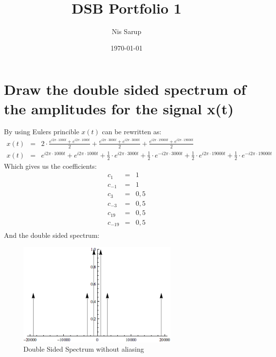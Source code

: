 \documentclass[a4wide,10pt]{article}
\begin{document}
\title{DSB Portfolio 1}
\author{Nis Sarup}
\date{\today}
\maketitle
\newpage

\tableofcontents
\newpage
\section{Draw the double sided spectrum of the amplitudes for the signal x(t)} %
\label{sec:draw_the_double_sided_spectrum_of_the_amplitudes_for_the_signal_x_t_}
By using Eulers princible $x(t)$ can be rewritten as:
\begin{eqnarray}
	x(t)&=&2\cdot \frac{e^{i2\pi \cdot 1000t}+e^{i2\pi \cdot 1000t}}{2}+\frac{e^{i2\pi \cdot 3000t}+e^{i2\pi \cdot 3000t}}{2}+\frac{e^{i2\pi \cdot 19000t}+e^{i2\pi \cdot 19000t}}{2} \nonumber \\
	x(t)&=&e^{i2\pi \cdot 1000t}+e^{i2\pi \cdot 1000t}+\frac{1}{2} \cdot e^{i2\pi \cdot 3000t}+\frac{1}{2} \cdot e^{-i2\pi \cdot 3000t}+\frac{1}{2} \cdot e^{i2\pi \cdot 19000t}+\frac{1}{2} \cdot e^{-i2\pi \cdot 19000t}
\end{eqnarray}
Which gives us the coefficients:
\begin{eqnarray}
	c_1&=&1 \nonumber \\
	c_{-1}&=&1 \nonumber \\
	c_3&=&0,5 \nonumber \\
	c_{-3}&=&0,5 \nonumber \\
	c_{19}&=&0,5 \nonumber \\
	c_{-19}&=&0,5 \nonumber \\
\end{eqnarray}
And the double sided spectrum:
\begin{figure}[htbp]
	\centering
		\includegraphics[width=8cm]{images/double-sided-spectrum-1.png}
	\caption{Double Sided Spectrum without aliasing}
	\label{fig:images_double-sided-spectrum-1}
\end{figure}
\end{document}
